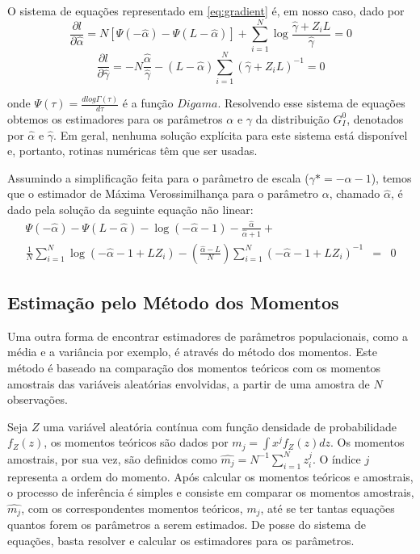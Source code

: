\documentclass[12pt]{article}
\begin{document}
O sistema de equações representado em \eqref{eq:gradient} é, em nosso caso, dado por
\begin{equation}
  \frac{\partial l}{\partial \widehat{\alpha}} = N[\Psi(-\widehat{\alpha}) - \Psi(L-\widehat{\alpha})] + \sum_{i=1}^{N}\log\frac{\widehat{\gamma} + Z_iL}{\widehat{\gamma}} = 0
\end{equation}
\begin{equation}
   \frac{\partial l}{\partial \widehat{\gamma}} = -N\frac{\widehat{\alpha}}{\widehat{\gamma}} - (L - \widehat{\alpha})\sum_{i=1}^{N}(\widehat{\gamma} + Z_iL)^{-1} = 0
\end{equation}

onde $\Psi(\tau) = \frac{\textit{d}log\Gamma(\tau)}{\textit{d}\tau}$ é a função $Digama$. Resolvendo esse sistema de equações obtemos os estimadores para os parâmetros $\alpha$ e $\gamma$ da distribuição $G_I^0$, denotados por $\widehat{\alpha}$ e $\widehat{\gamma}$. Em geral, nenhuma solução explícita para este sistema está disponível e, portanto, rotinas numéricas têm que ser usadas.

Assumindo a simplificação feita para o parâmetro de escala ($\gamma* = -\alpha - 1$), temos que o estimador de Máxima Verossimilhança para o parâmetro $\alpha$, chamado $\widehat{\alpha}$, é dado pela solução da seguinte equação não linear:
\begin{eqnarray}
    \Psi(-\widehat{\alpha}) - \Psi(L-\widehat{\alpha}) - \log(-\widehat{\alpha}-1) - \frac{\widehat{\alpha}}{\widehat{\alpha}+1} + \nonumber \\ \frac{1}{N}\sum_{i=1}^{N}\log(-\widehat{\alpha} - 1 + LZ_i) - \left ( \frac{\widehat{\alpha}-L}{N} \right )\sum_{i=1}^{N}(-\widehat{\alpha} - 1 + LZ_i)^{-1} & = & 0
\end{eqnarray}

\subsection{Estimação pelo Método dos Momentos}

Uma outra forma de encontrar estimadores de parâmetros populacionais, como a média e a variância por exemplo, é através do método dos momentos. Este método é baseado na comparação dos momentos teóricos com os momentos amostrais das variáveis aleatórias envolvidas, a partir de uma amostra de $N$ observações.

Seja $Z$ uma variável aleatória contínua com função densidade de probabilidade $f_Z(z)$, os momentos teóricos são dados por $m_j = \int x^jf_Z(z)dz$. Os momentos amostrais, por sua vez, são definidos como $\widehat{m_j} = N^{-1}\sum_{i=1}^{N}z_i^j$. O índice $\textit{j}$ representa a ordem do momento. Após calcular os momentos teóricos e amostrais, o processo de inferência é simples e consiste em comparar os momentos amostrais, $\widehat{m_j}$, com os correspondentes momentos teóricos, $m_j$, até se ter tantas equações quantos forem os parâmetros a serem estimados. De posse do sistema de equações, basta resolver e calcular os estimadores para os parâmetros.
\end{document}
